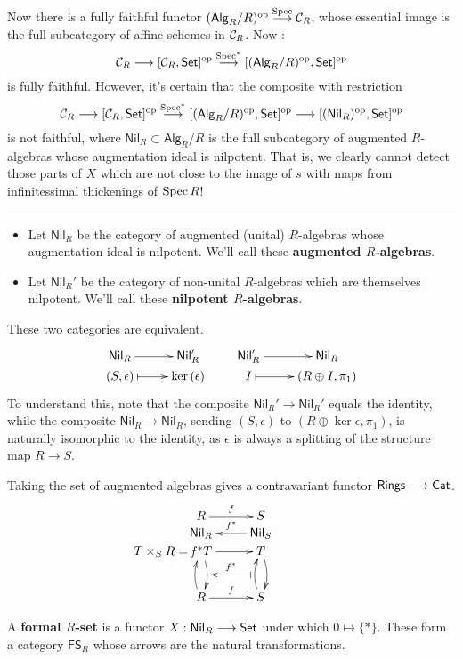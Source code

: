 \documentclass[11pt]{article}
\newcommand{\RAlg}{\mathsf{Alg}_R}
\newcommand{\RNil}{\mathsf{Nil}_R}
\newcommand{\SNil}{\mathsf{Nil}_S}
\newcommand{\FSR}{\mathsf{FS}_R}
\begin{document}
\begin{itemise}
\begin{shaded}
Now there is a fully faithful functor $(\RAlg/R)^{\op}\overset{\spec}{\to}\calC_R$, whose essential image is the full subcategory of affine schemes in $\mathcal{C}_R$. Now :
\[\calC_R\to[\calC_R,\Set]^{\op}\overset{\spec^*}{\to}[(\RAlg/R)^{\op},\Set]^{\op}\]
is fully faithful. However, it's certain that  the composite with restriction
\[\calC_R\to[\calC_R,\Set]^{\op}\overset{\spec^*}{\to}[(\RAlg/R)^{\op},\Set]^{\op}\to[(\RNil)^{\op},\Set]^{\op}\]
is not faithful,
where $\RNil\subset \RAlg/R$ is the full subcategory of augmented $R$-algebras whose augmentation ideal is nilpotent. That is, we clearly cannot detect those parts of $X$ which are not close to the image of $s$ with maps from infinitessimal thickenings of $\operatorname{Spec} R$!
\end{shaded}
\hrule
\item
\begin{itemize}\squishlist
\item Let $\RNil$ be the category of augmented (unital) $R$-algebras whose augmentation ideal is nilpotent. We'll call these \textbf{augmented $R$-algebras}.
\item Let $\RNil'$ be the category of non-unital $R$-algebras which are themselves nilpotent. We'll call these \textbf{nilpotent $R$-algebras}.
\end{itemize}
\noindent These two categories are equivalent.
\[\xymatrix@R=0mm{
\ar[r]^-{}%
\RNil&%
\RNil'\\%
(S,\epsilon)%
\ar@{|->}[r]&
\ker(\epsilon)%
}\qquad \xymatrix@R=0mm{
\ar[r]^-{}%
\RNil'&%
\RNil\\%
I%
\ar@{|->}[r]&
(R\oplus I,\pi_1)%
}\]
To understand this, note that the composite $\RNil'\to\RNil'$ equals the identity, while the composite $\RNil\to\RNil$, sending $(S,\epsilon)$ to $(R\oplus \ker\epsilon,\pi_1)$, is naturally isomorphic to the identity, as $\epsilon$ is always a splitting of the structure map $R\to S$.
\item Taking the set of augmented algebras gives a contravariant functor $\operatorname{{\mathsf{Rings}}}\longrightarrow\operatorname{{\mathsf{Cat}}}$.
\[\xymatrix@R=0mm{
\ar[r]^-{f}%
R&%
S\\%
\ar[r];[]_-{f^*}%
\RNil&%
\SNil\\%
\makebox[0cm][r]{$T\times_S R=$\,}f^*T
\ar[r]
\ar@/^.5em/[dd]_{}="2"
&
T\ar@/^.5em/[dd]
\\\rule{0mm}{6mm}\\
R\ar@/^.5em/[uu]\ar[r]^-{f}
&
S\ar@/^.5em/[uu]^{}="1"
\ar@{|->}"1";"2"_-{f^*}
}\]
\item A \textbf{formal $R$-set} is a functor $X:\RNil\to\Set$ under which $0\mapsto \{*\}$. These form a category $\FSR$ whose arrows are the natural transformations.


\end{itemise}
\end{document}
